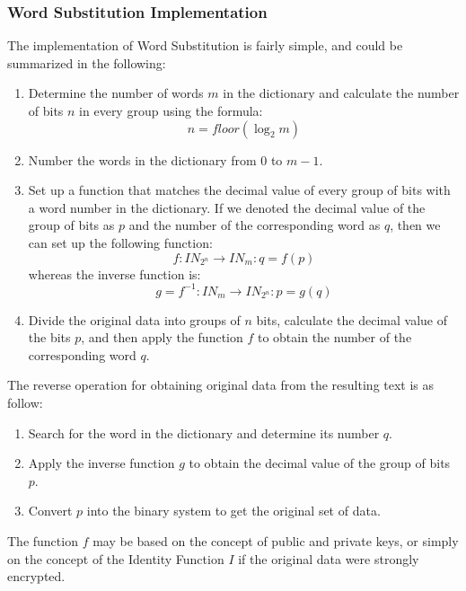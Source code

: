 \documentclass{acm_proc_article-sp}
\begin{document}
\subsubsection{Word Substitution Implementation}\label{Word-Substitution-Implementation}
The implementation of Word Substitution is fairly simple, and could be summarized in the following:
\begin{enumerate}
    \item Determine the number of words $m$ in the dictionary and calculate the number of bits $n$ in every group using the formula:
    \begin{equation*}
        n=\mathit{floor}(\log_{2}m)
    \end{equation*}
    \item Number the words in the dictionary from $0$ to $m-1$.
    \item Set up a function that matches the decimal value of every group of bits with a word number in the dictionary. If we denoted the decimal value of the group of bits as $p$ and the number of the corresponding word as $q$, then we can set up the following function:
    \begin{equation*}
        f:\mathit{IN}_{2^{n}}\rightarrow \mathit{IN}_{m}:q=f(p)
    \end{equation*}
    whereas the inverse function is:
    \begin{equation*}
        g=f^{-1}:\mathit{IN}_{m}\rightarrow \mathit{IN}_{2^{n}}:p=g(q)    
    \end{equation*}
    \item Divide the original data into groups of $n$ bits, calculate the decimal value of the bits $p$, and then apply the function $f$ to obtain the number of the corresponding word $q$.
\end{enumerate}
The reverse operation for obtaining original data from the resulting text is as follow:
\begin{enumerate}
    \item Search for the word in the dictionary and determine its number $q$.
    \item Apply the inverse function $g$ to obtain the decimal value of the group of bits $p$.
    \item Convert $p$ into the binary system to get the original set of data.
\end{enumerate}
The function $f$ may be based on the concept of public and private keys, or simply on the concept of the Identity Function $I$ if the original data were strongly encrypted.
\end{document}
